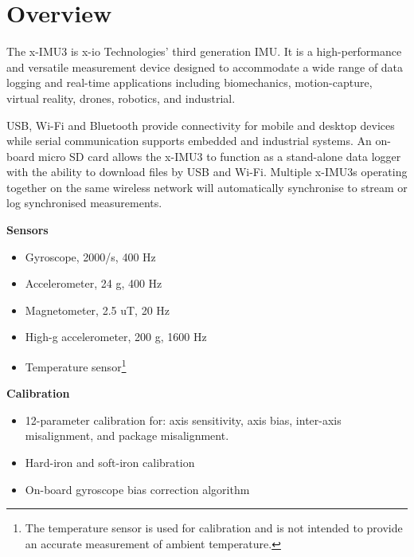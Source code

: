 \section{Overview}

\begin{multicols}{2}

The x-IMU3 is x-io Technologies' third generation \ac{IMU}.  It is a high-performance and versatile measurement device designed to accommodate a wide range of data logging and real-time applications including biomechanics, motion-capture, virtual reality, drones, robotics, and industrial.

\acs{USB}, Wi-Fi and Bluetooth provide connectivity for mobile and desktop devices while serial communication supports embedded and industrial systems.  An on-board micro \acs{SD} card allows the x-IMU3 to function as a stand-alone data logger with the ability to download files by USB and Wi-Fi.  Multiple x-IMU3s operating together on the same wireless network will automatically synchronise to stream or log synchronised measurements.

\textbf{Sensors}
\begin{itemize}[nolistsep]
    \item Gyroscope, \textpm{}2000\textdegree{}/s, 400 Hz
    \item Accelerometer, \textpm{}24 g, 400 Hz
    \item Magnetometer, \textpm{}2.5 uT, 20 Hz
    \item High-g accelerometer, \textpm{}200 g, 1600 Hz
    \item Temperature sensor\footnote{The temperature sensor is used for calibration and is not intended to provide an accurate measurement of ambient temperature.}
\end{itemize}

\textbf{Calibration}
\begin{itemize}[nolistsep]
    \item 12-parameter calibration for: axis sensitivity, axis bias, inter-axis misalignment, and package misalignment.
    \item Hard-iron and soft-iron calibration
    \item On-board gyroscope bias correction algorithm
\end{itemize}


\end{multicols}
